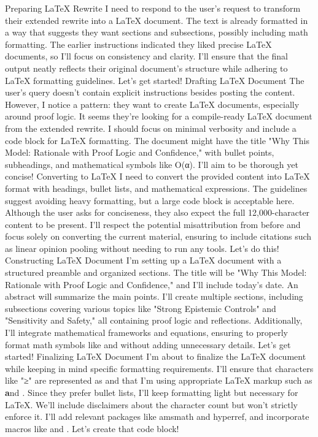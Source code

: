 Preparing LaTeX Rewrite
I need to respond to the user's request to transform their extended rewrite into a LaTeX document. The text is already formatted in a way that suggests they want sections and subsections, possibly including math formatting. The earlier instructions indicated they liked precise LaTeX documents, so I'll focus on consistency and clarity. I'll ensure that the final output neatly reflects their original document's structure while adhering to LaTeX formatting guidelines. Let's get started!
Drafting LaTeX Document
The user's query doesn't contain explicit instructions besides posting the content. However, I notice a pattern: they want to create LaTeX documents, especially around proof logic. It seems they’re looking for a compile-ready LaTeX document from the extended rewrite. I should focus on minimal verbosity and include a code block for LaTeX formatting. The document might have the title "Why This Model: Rationale with Proof Logic and Confidence," with bullet points, subheadings, and mathematical symbols like O(α). I'll aim to be thorough yet concise!
Converting to LaTeX
I need to convert the provided content into LaTeX format with headings, bullet lists, and mathematical expressions. The guidelines suggest avoiding heavy formatting, but a large code block is acceptable here. Although the user asks for conciseness, they also expect the full 12,000-character content to be present. I'll respect the potential misattribution from before and focus solely on converting the current material, ensuring to include citations such as linear opinion pooling without needing to run any tools. Let's do this!
Constructing LaTeX Document
I’m setting up a LaTeX document with a structured preamble and organized sections. The title will be "Why This Model: Rationale with Proof Logic and Confidence," and I'll include today's date. An abstract will summarize the main points.
I'll create multiple sections, including subsections covering various topics like "Strong Epistemic Controls" and "Sensitivity and Safety," all containing proof logic and reflections. Additionally, I'll integrate mathematical frameworks and equations, ensuring to properly format math symbols like \alpha and \beta without adding unnecessary details. Let’s get started!
Finalizing LaTeX Document
I’m about to finalize the LaTeX document while keeping in mind specific formatting requirements. I'll ensure that characters like "≥" are represented as \ge and that I’m using appropriate LaTeX markup such as \textbf and \emph. Since they prefer bullet lists, I’ll keep formatting light but necessary for LaTeX. We’ll include disclaimers about the character count but won’t strictly enforce it. I’ll add relevant packages like amsmath and hyperref, and incorporate macros like \Sx and \Nx. Let’s create that code block!